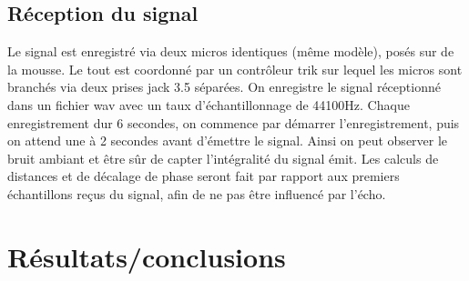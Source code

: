 \documentclass[12pt,a4paper]{report}
\begin{document}
\subsection{Réception du signal}
Le signal est enregistré via deux micros identiques (même modèle), posés sur de la mousse. Le tout est coordonné par un contrôleur trik sur lequel les micros sont branchés via deux prises jack 3.5 séparées.
On enregistre le signal réceptionné dans un fichier wav avec un taux d'échantillonnage de 44100Hz.
Chaque enregistrement dur 6 secondes, on commence par démarrer l'enregistrement, puis on attend une à 2 secondes avant d'émettre le signal. Ainsi on peut observer le bruit ambiant et être sûr de capter l'intégralité du signal émit.
Les calculs de distances et de décalage de phase seront fait par rapport aux premiers échantillons reçus du signal, afin de ne pas être influencé par l'écho.

\section{Résultats/conclusions}
\end{document}
